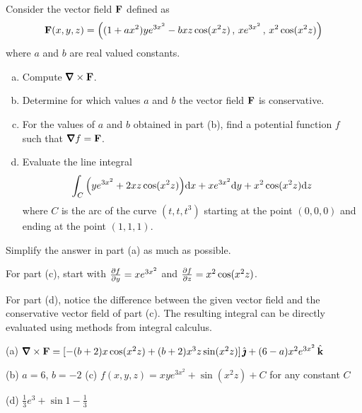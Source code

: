 \begin{solution}
\end{solution}

\begin{question}[M317 2009A] %
Consider the vector field $\mathbf{F}$ defined as
\begin{equation*}
\mathbf{F}(x,y,z) = \Big( (1 + ax^2 )ye^{3x^2} -  bxz \cos(x^2 z)\,,\,
                    xe^{3x^2} \,,\,
                    x^2 \cos(x^2 z) \Big)
\end{equation*}
where $a$ and $b$ are real valued constants.
\begin{enumerate}[(a)]
\item
Compute $\vnabla\times\vF$.
\item
Determine for which values $a$ and $b$ the vector field $\mathbf{F}$ is conservative.
\item
For the values of $a$ and $b$ obtained in part (b), find a potential function 
$f$ such that $\vnabla f = \vF$.
\item
Evaluate the line integral
\begin{equation*}
\int_C \Big(ye^{3x^2} + 2xz\cos(x^2 z)\Big) \mathrm{d}x 
          + xe^{3x^2} \mathrm{d}y
          + x^2 \cos(x^2 z) \mathrm{d}z
\end{equation*}
where $C$ is the arc of the curve $(t, t, t^3)$ starting at the point 
$(0, 0, 0)$ and ending at the point $(1, 1, 1)$.

\end{enumerate}
\end{question}

\begin{hint} 
Simplify the answer in part (a) as much as possible.

For part (c), start with $\pdiff{f}{y} = xe^{3x^2}$
and $\pdiff{f}{z} = x^2 \cos(x^2 z) $.

For part (d), notice the difference between the given vector field 
and the conservative vector field of part (c). The resulting integral can be directly evaluated using methods from integral calculus.
\end{hint}

\begin{answer} 
(a) $\vnabla\times\vF
    = [-(b+2)x\cos(x^2 z)+(b+2)x^3z\sin(x^2 z)]\,\hj 
           + (6-a)x^2e^{3x^2}\,\hk $

(b) $a=6$, $b=-2$\qquad
(c) $f(x,y,z) = xye^{3x^2} +\sin(x^2 z) + C$   for any constant $C$

(d) $\frac{1}{3} e^3 +\sin 1 -\frac{1}{3}$
\end{answer}


